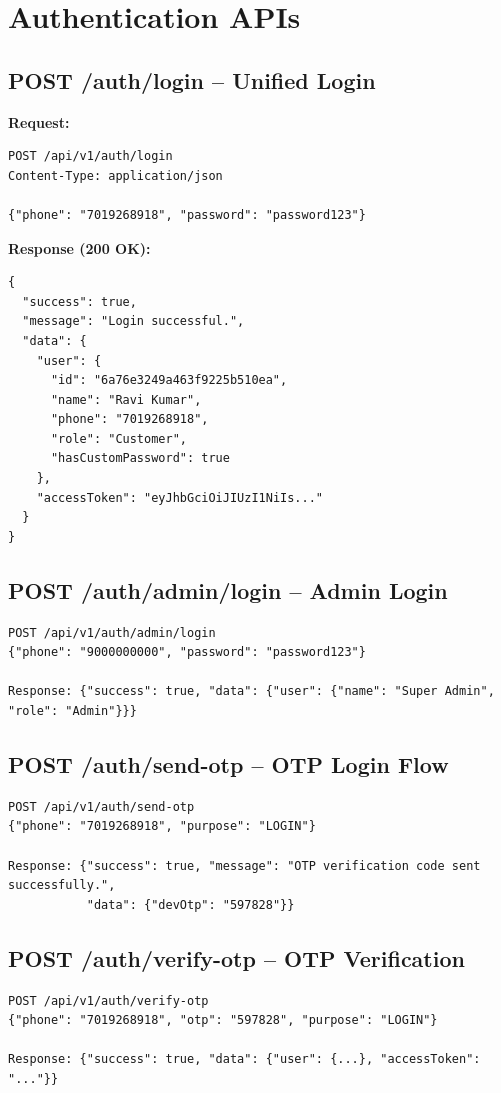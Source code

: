 \documentclass[11pt,a4paper]{article}
\begin{document}
\section{Authentication APIs}

\subsection{POST /auth/login -- Unified Login}
\textbf{Request:}
\begin{lstlisting}
POST /api/v1/auth/login
Content-Type: application/json

{"phone": "7019268918", "password": "password123"}
\end{lstlisting}

\textbf{Response (200 OK):}
\begin{lstlisting}
{
  "success": true,
  "message": "Login successful.",
  "data": {
    "user": {
      "id": "6a76e3249a463f9225b510ea",
      "name": "Ravi Kumar",
      "phone": "7019268918",
      "role": "Customer",
      "hasCustomPassword": true
    },
    "accessToken": "eyJhbGciOiJIUzI1NiIs..."
  }
}
\end{lstlisting}

\subsection{POST /auth/admin/login -- Admin Login}
\begin{lstlisting}
POST /api/v1/auth/admin/login
{"phone": "9000000000", "password": "password123"}

Response: {"success": true, "data": {"user": {"name": "Super Admin", "role": "Admin"}}}
\end{lstlisting}

\subsection{POST /auth/send-otp -- OTP Login Flow}
\begin{lstlisting}
POST /api/v1/auth/send-otp
{"phone": "7019268918", "purpose": "LOGIN"}

Response: {"success": true, "message": "OTP verification code sent successfully.",
           "data": {"devOtp": "597828"}}
\end{lstlisting}

\subsection{POST /auth/verify-otp -- OTP Verification}
\begin{lstlisting}
POST /api/v1/auth/verify-otp
{"phone": "7019268918", "otp": "597828", "purpose": "LOGIN"}

Response: {"success": true, "data": {"user": {...}, "accessToken": "..."}}
\end{lstlisting}
\end{document}
